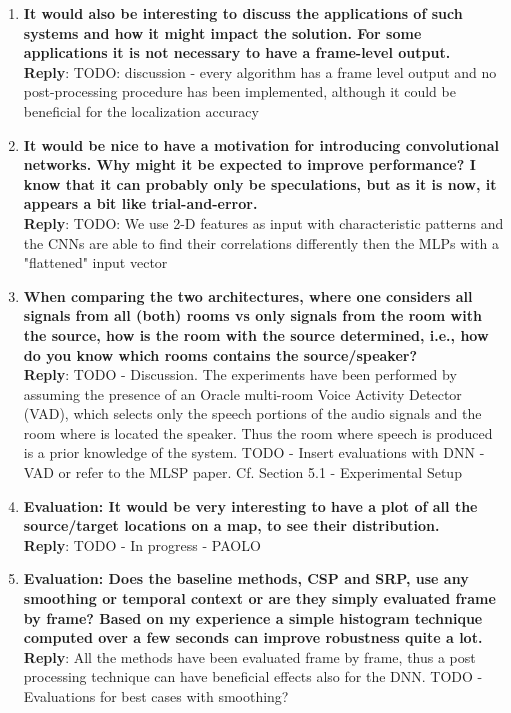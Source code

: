 \documentclass[11pt, technote, letterpaper, oneside, onecolumn]{IEEEtran}
\begin{document}
\begin{enumerate}
\item \textbf{It would also be interesting to discuss the applications of such systems and how it might impact the solution. For some applications it is not necessary to have a frame-level output.\\}
\textbf{Reply}: TODO: discussion - every algorithm has a frame level output and no post-processing procedure has been implemented, although it could be beneficial for the localization accuracy 

\item \textbf{It would be nice to have a motivation for introducing convolutional networks. Why might it be expected to improve performance? I know that it can probably only be speculations, but as it is now, it appears a bit like trial-and-error.\\}
\textbf{Reply}: TODO: We use 2-D features as input with characteristic patterns and the CNNs are able to find their correlations differently then the MLPs with a "flattened" input vector

\item \textbf{When comparing the two architectures, where one considers all signals from all (both) rooms vs only signals from the room with the source, how is the room with the source determined, i.e., how do you know which rooms contains the source/speaker?\\}
\textbf{Reply}: TODO - Discussion. The experiments have been performed by assuming the presence of an Oracle multi-room Voice Activity Detector (VAD), which selects only the speech portions of the audio signals and the room where is located the speaker. Thus the room where speech is produced is a prior knowledge of the system. 
TODO - Insert evaluations with DNN - VAD or refer to the MLSP paper. Cf. Section 5.1 - Experimental Setup
 
\item \textbf{Evaluation: It would be very interesting to have a plot of all the source/target locations on a map, to see their distribution.\\}
\textbf{Reply}: TODO - In progress - PAOLO

\item \textbf{Evaluation: Does the baseline methods, CSP and SRP, use any smoothing or temporal context or are they simply evaluated frame by frame? Based on my experience a simple histogram technique computed over a few seconds can improve robustness quite a lot.\\}
\textbf{Reply}: All the methods have been evaluated frame by frame, thus a post processing technique can have beneficial effects also for the DNN. TODO - Evaluations for best cases with smoothing?


\end{enumerate}
\end{document}
